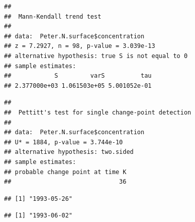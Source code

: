 \documentclass[]{article}
\newenvironment{Shaded}{\begin{snugshade}}{\end{snugshade}}
\newcommand{\KeywordTok}[1]{\textcolor[rgb]{0.13,0.29,0.53}{\textbf{#1}}}
\newcommand{\DecValTok}[1]{\textcolor[rgb]{0.00,0.00,0.81}{#1}}
\newcommand{\CommentTok}[1]{\textcolor[rgb]{0.56,0.35,0.01}{\textit{#1}}}
\newcommand{\OperatorTok}[1]{\textcolor[rgb]{0.81,0.36,0.00}{\textbf{#1}}}
\newcommand{\NormalTok}[1]{#1}
\begin{document}
\begin{verbatim}
## 
##  Mann-Kendall trend test
## 
## data:  Peter.N.surface$concentration
## z = 7.2927, n = 98, p-value = 3.039e-13
## alternative hypothesis: true S is not equal to 0
## sample estimates:
##            S         varS          tau 
## 2.377000e+03 1.061503e+05 5.001052e-01
\end{verbatim}

\begin{Shaded}
\end{Shaded}

\begin{verbatim}
## 
##  Pettitt's test for single change-point detection
## 
## data:  Peter.N.surface$concentration
## U* = 1884, p-value = 3.744e-10
## alternative hypothesis: two.sided
## sample estimates:
## probable change point at time K 
##                              36
\end{verbatim}

\begin{Shaded}
\end{Shaded}

\begin{verbatim}
## [1] "1993-05-26"
\end{verbatim}

\begin{Shaded}
\end{Shaded}

\begin{verbatim}
## [1] "1993-06-02"
\end{verbatim}

\begin{Shaded}
\end{Shaded}
\end{document}
